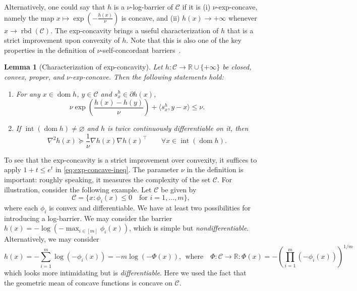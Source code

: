 \documentclass[a4paper]{article}
\renewcommand{\leq}{\leqslant}
\renewcommand{\succeq}{\succcurlyeq}
\newcommand{\CC}{\mathcal{C}}
\newcommand{\R}{\mathbb{R}}
\newcommand{\ip}[2]{\langle #1, #2\rangle}
\DeclareMathOperator{\dom}{dom}
\DeclareMathOperator{\inter}{int}
\DeclareMathOperator{\rbd}{rbd}
\newtheorem{lemma}{Lemma}
\begin{document}
Alternatively, one could say that $h$ is a $\nu$-log-barrier of $\CC$ if it is (i) $\nu$-exp-concave, namely the map $x\mapsto \exp(-\frac{h(x)}{\nu})$ is concave, and (ii) $h(x)\to +\infty$ whenever $x\to \rbd(\CC)$.
The exp-concavity brings a useful characterization of $h$ that is a strict improvement upon convexity of $h$.
Note that this is also one of the key properties in the definition of $\nu$-self-concordant barriers~\cite[Section 5.3]{nesterov2018lectures}.
\begin{lemma}[Characterization of exp-concavity]\label{lem:exp_concave}
	Let \(h:\CC\to\mathbb R\cup\{+\infty\}\) be closed, convex, proper, and \(\nu\)-exp-concave. Then the following statements hold:
    \begin{enumerate}[label=(\roman{*})]
        \item For any $x\in\dom h$, $y\in\CC$ and  $s_x^h\in\partial h(x)$,
        \begin{equation}\label{eq:exp-concave-ineq}
                \nu \exp\left(\frac{h(x)-h(y)}{\nu}\right)
                +\ip{ s_x^h}{y-x}
                \leq \nu.
        \end{equation}
        \item If \(\inter(\dom h)\neq \varnothing\) and \(h\) is twice continuously differentiable on it, then
        \[
                \nabla^2 h(x)
                \succeq
                \frac1\nu \nabla h(x)\nabla h(x)^\top
                \qquad\forall x\in\inter(\dom h).
        \]
	\end{enumerate}
\end{lemma}
To see that the exp-concavity is a strict improvement over convexity, it suffices to apply $1+t \leq e^t$ in \eqref{eq:exp-concave-ineq}.
The parameter $\nu$ in the definition is important: roughly speaking, it measures the complexity of the set $\CC$.
For illustration, consider the following example. Let $\CC$ be given by
\[
\CC = \{x\colon \phi_{i}(x) \leq 0 \quad \text{for $i=1,\dots, m$}\},
\]
where each $\phi_i$ is convex and differentiable.
We have at least two possibilities for introducing a log-barrier. We may consider the barrier $h(x) = -\log \left(-\max_{i\in[m]} \phi_i(x)\right)$, which is simple but \emph{nondifferentiable}.
Alternatively, we may consider
\[
h(x) = -\sum_{i=1}^m\log(-\phi_i(x)) = -m \log (-\Phi(x)),~~\text{where}\quad \Phi\colon \CC\to \R:  \Phi(x) = -\left(\prod_{i=1}^m(-\phi_i(x))\right)^{1/m}
\] 
which looks more intimidating but is \emph{differentiable}.
Here we used the fact that the geometric mean of concave functions is concave on $\CC$.
\end{document}
